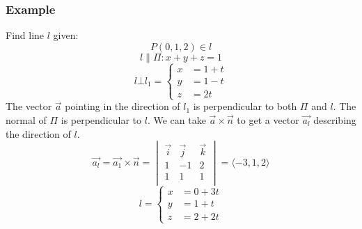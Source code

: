\documentclass{math}
\begin{document}
\subsubsection*{Example}
Find line \( l \) given:
\[ P(0,1,2)\in l \]
\[ l\parallel\Pi: x+y+z = 1 \]
\[ l\bot l_1 = \begin{cases}
  x &= 1+t \\
  y &= 1-t \\
  z &= 2t
\end{cases} \]
The vector \( \vec{a} \) pointing in the direction of \( l_1 \) is
perpendicular to both \( \Pi \) and \( l \). The normal of \( \Pi \) is
perpendicular to \( l \). We can take \( \vec{a}\times\vec{n} \) to get a
vector \( \vec{a_l} \) describing the direction of \( l \).
\[ \vec{a_l} = \vec{a_1}\times\vec{n} = \begin{vmatrix}
  \vec{i} & \vec{j} & \vec{k} \\
  1 & -1 & 2 \\
  1 & 1 & 1 \\
\end{vmatrix} = \langle-3,1,2\rangle \]
\[ l = \begin{cases}
  x &= 0+3t \\
  y &= 1+t \\
  z &= 2+2t
\end{cases} \]
\end{document}
